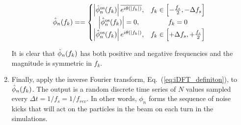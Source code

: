 \begin{enumerate}
    \begin{equation}
        \hat{\phi}_n(f_k) = = \left\{\begin{matrix}
   \left | \hat{\phi}_n^\mathrm{os}(f_k) \right | \overline{e^{{i}\theta (\mid f_k \mid)}}, & f_k \in \left [-\frac{f_s}{2}, -\Delta f_s \right] \\ 
    \left | \hat{\phi}_n^\mathrm{os}(f_k) \right | = 0, & f_k=0  \\
   \left | \hat{\phi}_n^\mathrm{os}(f_k) \right | e^{{i}\theta (\mid f_k \mid)}, & f_k \in \left [+ \Delta f_s, + \frac{f_s}{2} \right]  
    \end{matrix}\right.
    \end{equation}

    It is clear that $\hat{\phi}_n(f_k)$ has both positive and negative frequencies and the magnitude is symmetric in $f_k$.
    
    \item Finally, apply the inverse Fourier transform, Eq.~(\ref{eq:iDFT_definiton}), to $\hat{\phi}_n(f_k)$. The  output  is  a  random  discrete  time  series of $N$ values sampled every $\Delta t = 1/f_s=1/f_{rev}$. In other words, $\phi_n$ forms the sequence of noise kicks that will act on the particles in the beam on each turn in the simulations.

\end{enumerate} 


